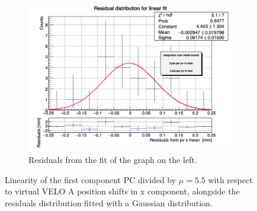 $$\begin{figure}
\begin{subfigure}{0.48\textwidth}
    \includegraphics[width=\linewidth]{figures/x_res_veloA_MC.png}
    \caption{Residuals from the fit of the graph on the left. }\label{fig:x_veloA_res_MC}
    \end{subfigure}
    \caption{Linearity of the first component PC divided by $\mu=5.5$ with respect to virtual VELO A position shifts in x component, alongside the residuals distribution fitted with a Gaussian distribution.}
    \label{fig:x_veloA_MC}
\end{figure}


